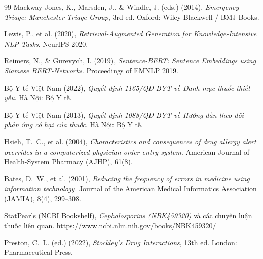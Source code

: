 \documentclass[a4paper,13pt,3p,twoside,openany]{report}
\theoremstyle{definition}
\theoremstyle{remark}
\theoremstyle{definition}
\begin{document}
\begin{thebibliography}{99}
 Mackway-Jones, K., Marsden, J., \& Windle, J. (eds.) (2014), \textit{Emergency Triage: Manchester Triage Group}, 3rd ed. Oxford: Wiley-Blackwell / BMJ Books.

 Lewis, P., et al. (2020), \textit{Retrieval-Augmented Generation for Knowledge-Intensive NLP Tasks}. NeurIPS 2020.

 Reimers, N., \& Gurevych, I. (2019), \textit{Sentence-BERT: Sentence Embeddings using Siamese BERT-Networks}. Proceedings of EMNLP 2019.


 Bộ Y tế Việt Nam (2022), \textit{Quyết định 1165/QĐ-BYT về Danh mục thuốc thiết yếu}. Hà Nội: Bộ Y tế.

 Bộ Y tế Việt Nam (2013), \textit{Quyết định 1088/QĐ-BYT về Hướng dẫn theo dõi phản ứng có hại của thuốc}. Hà Nội: Bộ Y tế.

 Hsieh, T.~C., et al. (2004), \textit{Characteristics and consequences of drug allergy alert overrides in a computerized physician order entry system}. American Journal of Health-System Pharmacy (AJHP), 61(8).

 Bates, D.~W., et al. (2001), \textit{Reducing the frequency of errors in medicine using information technology}. Journal of the American Medical Informatics Association (JAMIA), 8(4), 299--308.

 StatPearls (NCBI Bookshelf), \textit{Cephalosporins (NBK459320)} và các chuyên luận thuốc liên quan. \url{https://www.ncbi.nlm.nih.gov/books/NBK459320/}

 Preston, C.~L. (ed.) (2022), \textit{Stockley's Drug Interactions}, 13th ed. London: Pharmaceutical Press.

\end{thebibliography}
\end{document}
